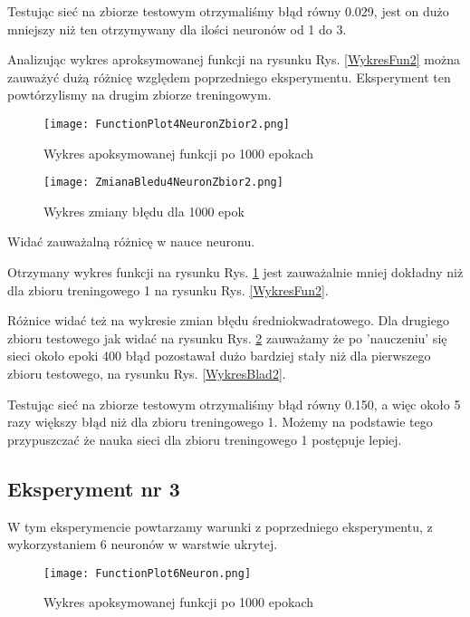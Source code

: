 \documentclass[12pt]{article}
\begin{document}
Testując sieć na zbiorze testowym otrzymaliśmy błąd równy 0.029, jest on dużo mniejszy niż ten otrzymywany dla ilości neuronów od 1 do 3. 

Analizując wykres aproksymowanej funkcji na rysunku Rys. \ref{WykresFun2} można zauważyć dużą różnicę względem poprzedniego eksperymentu.
\newpage
Eksperyment ten powtórzylismy na drugim zbiorze treningowym. 

\begin{figure}[!htb]
 \centering
 \texttt{[image: FunctionPlot4NeuronZbior2.png]}
 \caption{Wykres apoksymowanej funkcji po 1000 epokach}
 \vspace{-0.3cm}
 \label{WykresFun3}
\end{figure}



\begin{figure}[!htb]
 \centering
 \texttt{[image: ZmianaBledu4NeuronZbior2.png]}
 \vspace{-0.3cm}
 \caption{Wykres zmiany błędu dla 1000 epok}
 \label{WykresBlad3}
\end{figure}

\newpage
Widać zauważalną różnicę w nauce neuronu.

Otrzymany wykres funkcji na rysunku Rys. \ref{WykresFun3} jest zauważalnie mniej dokładny niż dla zbioru treningowego 1 na rysunku Rys. \ref{WykresFun2}.

Różnice widać też na wykresie zmian błędu średniokwadratowego. Dla drugiego zbioru testowego jak widać na rysunku Rys. \ref{WykresBlad3} zauważamy że po 'nauczeniu' się sieci około epoki 400 błąd pozostawał dużo bardziej stały niż dla pierwszego zbioru testowego, na rysunku Rys. \ref{WykresBlad2}.

Testując sieć na zbiorze testowym otrzymaliśmy błąd równy 0.150, a więc około 5 razy większy błąd niż dla zbioru treningowego 1. Możemy na podstawie tego przypuszczać że nauka sieci dla zbioru treningowego 1 postępuje lepiej.
\newpage

\subsection{Eksperyment nr 3}
W tym eksperymencie powtarzamy warunki z poprzedniego eksperymentu, z wykorzystaniem 6 neuronów w warstwie ukrytej.

\begin{figure}[!htb]
 \centering
 \texttt{[image: FunctionPlot6Neuron.png]}
 \caption{Wykres apoksymowanej funkcji po 1000 epokach}
 \vspace{-0.3cm}
 \label{WykresFun4}
\end{figure}
\end{document}
